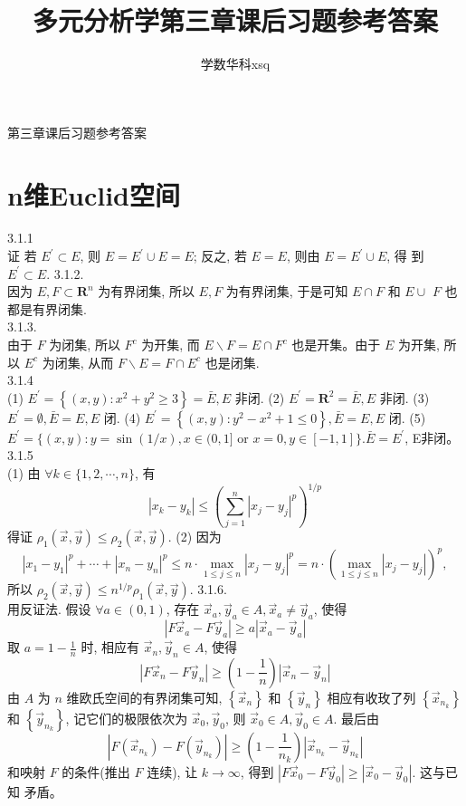 \documentclass[a4paper,11pt,UTF8]{article}
\title{多元分析学第三章课后习题参考答案}
\author{学数华科xsq}
\begin{document}
第三章课后习题参考答案

\section{n维Euclid空间}
3.1.1\\
证 若 $E^{\prime} \subset E$, 则 $E=E^{\prime} \cup E=E$; 反之, 若 $E=E$, 则由 $E=E^{\prime} \cup E$, 得 到 $E^{\prime} \subset E$.
3.1.2. \\
因为 $E, F \subset \mathbf{R}^n$ 为有界闭集, 所以 $E, F$ 为有界闭集, 于是可知 $E \cap F$ 和 $E \cup$ $F$ 也都是有界闭集.\\
3.1.3.\\
 由于 $F$ 为闭集, 所以 $F^c$ 为开集, 而 $E \backslash F=E \cap F^c$ 也是开集。由于 $E$ 为开集, 所以 $E^c$ 为闭集, 从而 $F \backslash E=F \cap E^c$ 也是闭集.\\
3.1.4\\
(1) $E^{\prime}=\left\{(x, y): x^2+y^2 \geq 3\right\}=\bar{E}, E$ 非闭.
(2) $E^{\prime}=\mathbf{R}^2=\bar{E}, E$ 非闭.
(3) $E^{\prime}=\emptyset, \bar{E}=E, E$ 闭.
(4) $E^{\prime}=\left\{(x, y): y^2-x^2+1 \leq 0\right\}, \bar{E}=E, E$ 闭.
(5) $E^{\prime}=\{(x, y): y=\sin (1 / x), x \in(0,1]$ or $x=0, y \in[-1,1]\} . \bar{E}=E^{\prime}$, E非闭。\\
3.1.5\\
 (1) 由 $\forall k \in\{1,2, \cdots, n\}$, 有
$$
\left|x_k-y_k\right| \leq\left(\sum_{j=1}^n\left|x_j-y_j\right|^p\right)^{1 / p}
$$
得证 $\rho_1(\vec{x}, \vec{y}) \leq \rho_2(\vec{x}, \vec{y})$.
(2) 因为
$$
\left|x_1-y_1\right|^p+\cdots+\left|x_n-y_n\right|^p \leq n \cdot \max _{1 \leq j \leq n}\left|x_j-y_j\right|^p=n \cdot\left(\max _{1 \leq j \leq n}\left|x_j-y_j\right|\right)^p,
$$
所以 $\rho_2(\vec{x}, \vec{y}) \leq n^{1 / p} \rho_1(\vec{x}, \vec{y})$.
3.1.6. \\ 用反证法. 假设 $\forall a \in(0,1)$, 存在 $\vec{x}_a, \vec{y}_a \in A, \vec{x}_a \neq \vec{y}_a$, 使得
$$
\left|F \vec{x}_a-F \vec{y}_a\right| \geq a\left|\vec{x}_a-\vec{y}_a\right|
$$
取 $a=1-\frac{1}{n}$ 时, 相应有 $\vec{x}_n, \vec{y}_n \in A$, 使得
$$
\left|F \vec{x}_n-F \vec{y}_n\right| \geq\left(1-\frac{1}{n}\right)\left|\vec{x}_n-\vec{y}_n\right|
$$
由 $A$ 为 $n$ 维欧氏空间的有界闭集可知, $\left\{\vec{x}_n\right\}$ 和 $\left\{\vec{y}_n\right\}$ 相应有收玫了列 $\left\{\vec{x}_{n_k}\right\}$ 和 $\left\{\vec{y}_{n_k}\right\}$, 记它们的极限依次为 $\vec{x}_0, \vec{y}_0$, 则 $\vec{x}_0 \in A, \vec{y}_0 \in A$. 最后由
$$
\left|F\left(\vec{x}_{n_k}\right)-F\left(\vec{y}_{n_k}\right)\right| \geq\left(1-\frac{1}{n_k}\right)\left|\vec{x}_{n_k}-\vec{y}_{n_k}\right|
$$
和咉射 $F$ 的条件(推出 $F$ 连续), 让 $k \rightarrow \infty$, 得到 $\left|F \vec{x}_0-F \vec{y}_0\right| \geq\left|\vec{x}_0-\vec{y}_0\right|$. 这与已知 矛盾。
\end{document}
